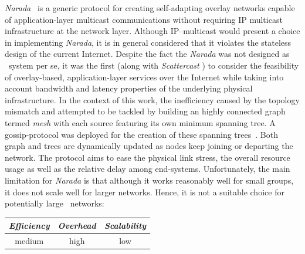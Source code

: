 
{\sl Narada}~\cite{CRZ2000,CRSZ2001,CRSZ2002} is a generic
protocol for creating self-adapting overlay networks capable of 
application-layer multicast communications without requiring IP multicast
infrastructure at the network layer.
Although IP--multicast would present a choice in implementing
{\sl Narada}, it is in general considered that it violates the 
stateless design of the current Internet.
Despite the fact the {\sl Narada} was not designed as \p\ system per se,
it was the first (along with \emph{Scattercast} \cite{C2000}) to consider the
feasibility of overlay-based, application-layer services over the Internet while
taking into account bandwidth and latency properties of the underlying physical
infrastructure. In the context of this work, the inefficiency caused by the
topology mismatch and attempted to be tackled by building an highly connected
graph termed \emph{mesh}
with each source featuring its own minimum spanning tree. A gossip-protocol was
deployed for the creation of these spanning trees~\cite{LYL2008}.
Both graph and trees are dynamically updated as nodes keep joining 
or departing the network. The protocol aims to ease the physical link stress,
the overall resource usage as well as the relative delay among end-systems. 
Unfortunately, the main limitation for {\sl Narada} is that 
although it works reasonably well for small groups, 
it does not scale well for larger networks. 
Hence, it is not a suitable choice for potentially large \p\ networks:
\begin{center}
{\footnotesize
\begin{tabular}{ccc}
\emph{Efficiency} & \emph{Overhead} & \emph{Scalability} \\
\hline
%
medium &
high &
low
\end{tabular}
}
\end{center}

